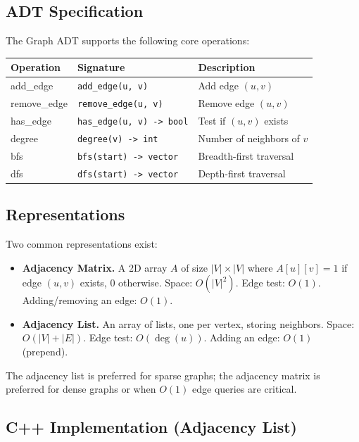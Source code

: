 \subsection{ADT Specification}

The Graph ADT supports the following core operations:

\begin{center}
\begin{tabular}{lll}
\toprule
Operation & Signature & Description \\
\midrule
add\_edge & \texttt{add\_edge(u, v)} & Add edge $(u, v)$ \\
remove\_edge & \texttt{remove\_edge(u, v)} & Remove edge $(u, v)$ \\
has\_edge & \texttt{has\_edge(u, v) -> bool} & Test if $(u, v)$ exists \\
degree & \texttt{degree(v) -> int} & Number of neighbors of $v$ \\
bfs\index{BFS} & \texttt{bfs(start) -> vector} & Breadth-first traversal \\
dfs\index{DFS} & \texttt{dfs(start) -> vector} & Depth-first traversal \\
\bottomrule
\end{tabular}
\end{center}

\subsection{Representations}

Two common representations exist:

\begin{itemize}
\item \textbf{Adjacency Matrix.} A 2D array $A$ of size $|V| \times |V|$ where $A[u][v] = 1$ if edge $(u,v)$ exists, 0 otherwise. Space: $O(|V|^2)$. Edge test: $O(1)$. Adding/removing an edge: $O(1)$.
\item \textbf{Adjacency List.} An array of lists, one per vertex, storing neighbors. Space: $O(|V| + |E|)$. Edge test: $O(\deg(u))$. Adding an edge: $O(1)$ (prepend).
\end{itemize}

The adjacency list is preferred for sparse graphs; the adjacency matrix is preferred for dense graphs or when $O(1)$ edge queries are critical.

\subsection{C++ Implementation (Adjacency List)}

